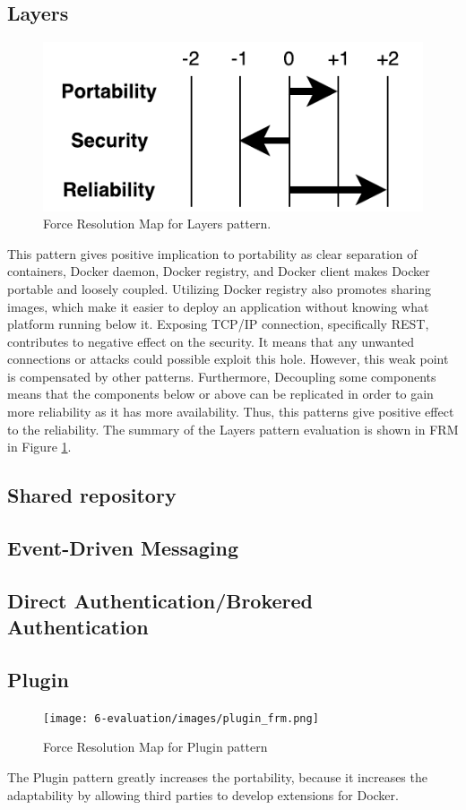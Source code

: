 \subsection{Layers}
\begin{figure}[H]
\centering
\includegraphics[scale=0.7]{6-evaluation/images/layers_frm.pdf}
\caption{Force Resolution Map for Layers pattern.}
\label{fig:layers-frm}
\end{figure}
This pattern gives positive implication to portability as clear separation of
containers, Docker daemon, Docker registry, and Docker client makes Docker
portable and loosely coupled. Utilizing Docker registry also promotes sharing
images, which make it easier to deploy an application without knowing what
platform running below it. Exposing TCP/IP connection, specifically REST,
contributes to negative effect on the security. It means that any unwanted
connections or attacks could possible exploit this hole. However, this weak
point is compensated by other patterns. Furthermore, Decoupling some components
means that the components below or above can be replicated in order to gain more
reliability as it has more availability. Thus, this patterns give positive
effect to the reliability. The summary of the Layers pattern evaluation is shown
in FRM in Figure \ref{fig:layers-frm}.

\subsection{Shared repository}
\subsection{Event-Driven Messaging}
\subsection{Direct Authentication/Brokered Authentication}
\subsection{Plugin}
\begin{figure}[H]
\centering
\texttt{[image: 6-evaluation/images/plugin\_frm.png]}
\caption{Force Resolution Map for Plugin pattern}
\label{fig:plugin-frm}
\end{figure}
The Plugin pattern greatly increases the portability, because it increases the adaptability by allowing third parties to develop extensions for Docker. 

